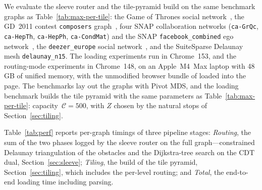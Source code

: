 \documentclass[review]{vgtc}          %
\newcommand{\msagljs}{\textsf{\libname}}
\begin{document}
We evaluate the sleeve router and the tile-pyramid build on the same benchmark graphs as Table~\ref{tab:max-per-tile}: the Game of Thrones social network~\cite{beveridge2018game}, the GD~2011 contest \texttt{composers} graph~\cite{composers}, four SNAP collaboration networks (\texttt{ca-GrQc}, \texttt{ca-HepTh}, \texttt{ca-HepPh}, \texttt{ca-CondMat}) and the SNAP \texttt{facebook\_combined} ego network~\cite{leskovec2007graph,fb}, the \texttt{deezer\_europe} social network~\cite{feather}, and the SuiteSparse Delaunay mesh \texttt{delaunay\_n15}. The loading experiments run in Chrome~153, and the routing-mode experiments in Chrome~148, on an Apple~M4~Max laptop with 48\,GB of unified memory, with the unmodified browser bundle of \msagljs{} loaded into the page. The benchmarks lay out the graphs with Pivot MDS, and the loading benchmark builds the tile pyramid with the same parameters as Table~\ref{tab:max-per-tile}: capacity~$\mathcal{C}=500$, with $Z$ chosen by the natural stops of Section~\ref{sec:tiling}.

Table~\ref{tab:perf} reports per-graph timings of three pipeline stages: \emph{Routing}, the sum of the two phases logged by the sleeve router on the full graph---constrained Delaunay triangulation of the obstacles and the Dijkstra-tree search on the CDT dual, Section~\ref{sec:sleeve}; \emph{Tiling}, the build of the tile pyramid, Section~\ref{sec:tiling}, which includes the per-level routing; and \emph{Total}, the end-to-end loading time including parsing.
\end{document}
